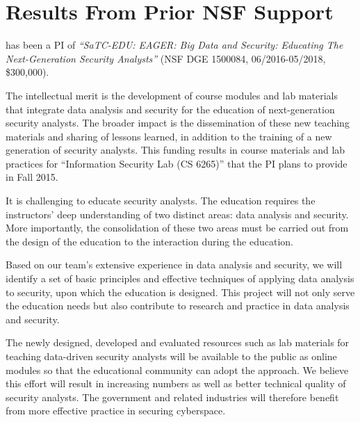 \section{Results From Prior NSF Support}
\label{sec:prior}

\kim has been a PI of
\emph{``SaTC-EDU: EAGER: Big Data and Security: Educating The
  Next-Generation Security Analysts''} (NSF DGE 1500084, 06/2016-05/2018, \$300,000).

The intellectual merit is the development of course modules and lab materials
that integrate data analysis and security
for the education of next-generation security analysts.
The broader impact is the
dissemination of these new teaching materials and sharing of lessons
learned, in addition to the training of a new generation of security
analysts.
%
This funding results in course materials and lab practices
for ``Information Security Lab (CS 6265)''
that the PI plans to provide in Fall 2015.
\fi

It is challenging to educate security analysts. 
The education requires the instructors' deep understanding of two distinct areas: 
data analysis and security. More importantly, the consolidation of these two 
areas must be carried out from the design of the education to the interaction 
during the education. 

%
Based on our team's extensive experience in data analysis and
security, we will identify a set of basic principles and effective 
techniques of applying data analysis to security, upon which the education is 
designed.
%
This project will not only serve the
education needs but also contribute to research and practice in
data analysis and security.

The newly designed, developed and evaluated
resources such as lab materials
for teaching data-driven security analysts
will be available to the public as online modules
so that the educational community can adopt the approach.
%
We believe this effort will result in increasing numbers as well as better 
technical quality of security analysts. The government and related industries 
will therefore benefit from more effective practice in securing cyberspace.
